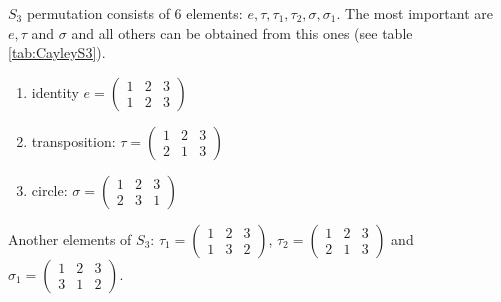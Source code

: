 \begin{appendices}
\begin{example}[$S_3$ group]
    $S_3$ permutation consists of 6 elements: $e, \tau, \tau_1, \tau_2,
    \sigma, \sigma_1$. The most important are $e, \tau$ and $\sigma$
    and all others can be obtained from this ones (see table
    \ref{tab:CayleyS3}).
  \begin{enumerate}
  \item identity
    \(
    e = \begin{pmatrix}
      1 & 2 & 3\\
      1 & 2 & 3
    \end{pmatrix}
    \) 
  \item transposition:
    \(
    \tau = \begin{pmatrix}
      1 & 2 & 3\\
      2 & 1 & 3
    \end{pmatrix}
    \) 
  \item circle:
    \(
    \sigma = \begin{pmatrix}
      1 & 2 & 3\\
      2 & 3 & 1
    \end{pmatrix}
    \) 
  \end{enumerate}

  Another elements of $S_3$:
  \(
  \tau_1 = \begin{pmatrix}
    1 & 2 & 3\\
    1 & 3 & 2
  \end{pmatrix}
  \),
  \(
  \tau_2 = \begin{pmatrix}
    1 & 2 & 3\\
    2 & 1 & 3
  \end{pmatrix}
  \) and
  \(
  \sigma_1 = \begin{pmatrix}
    1 & 2 & 3\\
    3 & 1 & 2
  \end{pmatrix}
  \).    


\end{example}
\end{appendices}
